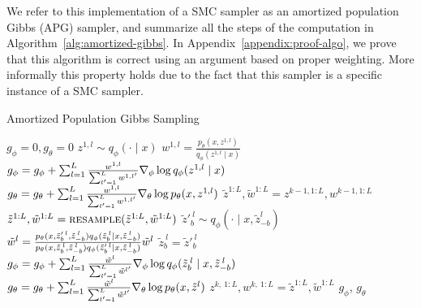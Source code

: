\documentclass{article}
\theoremstyle{definition}
\begin{document}
We refer to this implementation of a SMC sampler as an amortized population Gibbs (APG) sampler, and summarize all the steps of the computation in Algorithm~\ref{alg:amortized-gibbs}. In Appendix~\ref{appendix:proof-algo}, we prove that this algorithm is correct using an argument based on proper weighting. More informally this property holds due to the fact that this sampler is a specific instance of a SMC sampler. 

\begin{algorithm}[!tb]
  \caption{Amortized Population Gibbs Sampling}
  \label{alg:amortized-gibbs}
\begin{algorithmic}[1]
\small
  \State $g_\phi = 0, g_\theta = 0$\label{line:init-grad}
  \label{line:rws-loop}
      \State $z^{1,l} \sim q_\phi(\cdot \mid x)$\label{line:rws-propose}
      \State $w^{1,l} = \frac{p_\theta(x, z^{1,l})}{q_\phi(z^{1,l} \mid x)}$\label{line:rws-weight}
  \EndFor
  \State $g_\phi = g_\phi + \sum_{l = 1}^L \frac{w^{1,l}}{\sum_{l' = 1}^L w^{1,l'}} \nabla_\phi \log q_\phi(z^{1,l} \mid x)$\label{line:rws-grad-phi}
  \State $g_\theta = g_\theta + \sum_{l = 1}^L \frac{w^{1,l}}{\sum_{l' = 1}^L w^{1,l'}} \nabla_\theta \log p_\theta(x, z^{1,l})$\label{line:rws-grad-theta}
  \label{line:sweep-loop}
    \State $\tilde{z}^{1:L}, \tilde{w}^{1:L} = z^{k-1,1:L}, w^{k-1,1:L}$ \label{line:apg-sweep-begin}
    \label{line:block-loop}
      \State $\tilde{z}^{1:L}, \tilde{w}^{1:L}=\textsc{resample}(\tilde{z}^{1:L}, \tilde{w}^{1:L})$\label{line:resample} 
        \label{line:apg-sample-loop}
          \State $\tilde{z}'^{\:l}_b \sim q_\phi(\cdot \mid x, \tilde{z}_{-b}^l)$\label{line:apg-propose}
          \State \label{line:apg-weight} $\tilde{w}^l = \frac{p_\theta(x, \tilde{z}'^{\:l}_{b}, \tilde{z}^{\:l}_{-b}) q_\phi(\tilde{z}^{\:l}_b \mid x, \tilde{z}^{\:l}_{-b})}{p_\theta(x, \tilde{z}^{\:l}_b, \tilde{z}^{\:l}_{-b}) q_\phi(\tilde{z}'^{\:l}_b \mid x, \tilde{z}^{\:l}_{-b})}\tilde{w}^l$ 
          \State \label{line:apg-reassign}$\tilde{z}^{\:l}_b = \tilde{z}'^{\:l}_b$ 
      \EndFor
      \State $g_\phi=g_\phi+ \sum_{l = 1}^L\frac{\tilde{w}^l}{\sum_{l'= 1}^L \tilde{w}^{l'}} \nabla_\phi\log q_\phi(\tilde{z}^{\:l}_b \mid x, \tilde{z}^{\:l}_{-b})$\label{line:apg-grad-phi}
      \State $g_\theta = g_\theta + \sum_{l = 1}^L \frac{\tilde{w}^l}{\sum_{l' = 1}^L \tilde{w}^{l'}} \nabla_\theta \log p_\theta(x, \tilde{z}^l)$ \label{line:apg-grad-theta}
     \EndFor
     \State $z^{k,\:1:L}, w^{k,\:1:L} = \tilde{z}^{1:L}, \tilde{w}^{1:L}$\label{line:apg-sweep-end}
     \vspace{0.5em}
  \EndFor
  \Return $g_\phi$, $g_\theta$
\end{algorithmic}
\end{algorithm}
\end{document}

